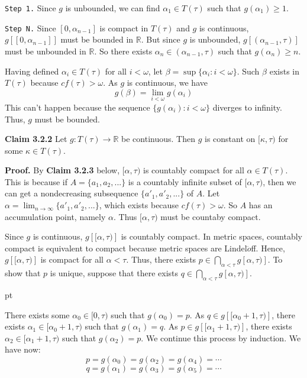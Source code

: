 \documentclass{article}
\begin{document}
\texttt{Step 1.}
Since $g$ is unbounded, we can find $\alpha_1\in T(\tau)$ such that $g(\alpha_1)\geq1$. 

\vskip 5pt

\texttt{Step N.}
Since $[0,\alpha_{n-1}]$ is compact in $T(\tau)$ and $g$ is continuous, $g\left[[0,\alpha_{n-1}]\right]$ must be bounded in $\mathbb{R}.$ 
But since $g$ is unbounded,  $g\left[(\alpha_{n-1}, \tau)\right]$ must be unbounded in $\mathbb{R}$. So there exists $\alpha_n\in (\alpha_{n-1}, \tau)$
such that $g(\alpha_n) \geq n$. 


\vskip 5pt

Having defined $\alpha_i\in T(\tau)$ for all $i<\omega$, let $\beta=\sup\{\alpha_i: i<\omega\}$. Such $\beta$ exists in $T(\tau)$ because $cf(\tau)>\omega$. As $g$ is continuous, we have $$g(\beta)=\lim_{i<\omega} g(\alpha_i)$$  This can't happen because the sequence $\{g(\alpha_i): i<\omega\}$ diverges to infinity. Thus, $g$ must be bounded. 



\vskip 25pt
\textbf{Claim 3.2.2} Let $g: T(\tau)\rightarrow \mathbb{R}$ be continuous.
Then  $g$ is constant on $[\kappa, \tau)$ for some $\kappa\in T(\tau)$.

\vskip 15pt


\textbf{Proof.}
By \textbf{Claim 3.2.3} below, $[\alpha,\tau)$ is countably compact for all $\alpha \in T(\tau)$. 
This is because if $A=\{a_1,a_2,...\}$ is a countably infinite subset of $[\alpha,\tau)$, then 
we can get a nondecreasing subsequence $\{a'_1,a'_2,...\}$ of $A$. Let $\alpha=\lim_{n\rightarrow \infty} \{a'_1,a'_2,...\}$, which exists because $cf(\tau)>\omega$. So $A$ has an accumulation point, namely $\alpha$. Thus $[\alpha,\tau)$ must be countaby compact.

\vskip 15pt

Since $g$ is continuous, $g\left[[\alpha, \tau)\right]$ is countably compact. In metric spaces, countably compact is equivalent to compact because metric spaces are Lindel$\ddot{o}$ff. Hence, $g\left[[\alpha,\tau)\right]$ is compact for all $\alpha<\tau$. 
Thus, there exists $p \in \bigcap_{\alpha<\tau} g\left[\alpha, \tau)\right]$. To show that $p$ is unique, suppose that there exists $q \in \bigcap_{\alpha<\tau} g\left[\alpha, \tau)\right]$. 

 pt

There exists some $\alpha_0 \in [0,\tau)$ such that $g(\alpha_0)=p$. As $q\in g\left[[\alpha_0+1,\tau)\right]$, there exists $\alpha_1\in [\alpha_0+1,\tau)$ such that $g(\alpha_1)=q.$ As $p\in g\left[[\alpha_1+1,\tau)\right]$, there exists $\alpha_2\in [\alpha_1+1,\tau)$ such that $g(\alpha_2)=p.$ We continue this process by induction. We have now: 
$$p=g(\alpha_0)=g(\alpha_2)=g(\alpha_4)=\cdots$$
$$q=g(\alpha_1)=g(\alpha_3)=g(\alpha_5)=\cdots$$
\end{document}
